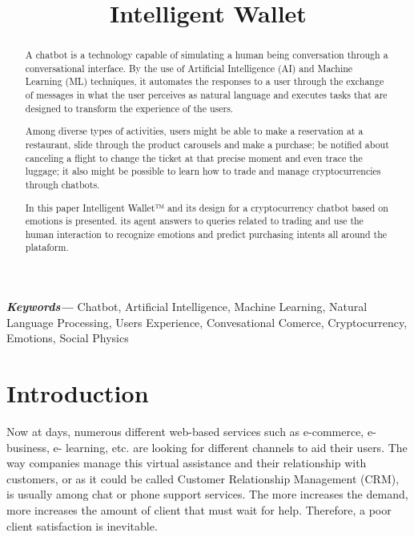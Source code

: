 \documentclass[	DIV=calc,%
							paper=letter,%
							fontsize=12pt%
                            ]{scrartcl}	 					%
\title{Intelligent Wallet}					%
\author{}											%
\date{}																				%
\newcommand{\initial}[1]{%
     \lettrine[lines=3,lhang=0.3,nindent=0em]{
     				\color{DarkGoldenrod}
     				{\textsf{#1}}}{}}
\providecommand{\keywords}[1]
{
  \small	
  \textbf{\textit{Keywords---}} #1
}
\begin{document}
\maketitle


\newpage
\begin{abstract}
	
{A chatbot is a technology capable of simulating a human being conversation through a conversational interface. By the use of Artificial Intelligence (AI) and Machine Learning (ML) techniques, it automates the responses to a user through the exchange of messages in what the user perceives as natural language and executes tasks that are designed to transform the experience of the users.

Among diverse types of activities, users might be able to make a reservation   at a restaurant, slide through the product carousels and make a purchase; be notified about canceling a flight to change the ticket at that precise moment and even trace the luggage; it also might be possible to learn how to trade and manage cryptocurrencies through chatbots.

In this paper Intelligent Wallet™ and its design for a cryptocurrency chatbot based on emotions is presented. its agent  answers to queries related to trading and use the human interaction to recognize emotions and predict purchasing intents all around the plataform.}

\end{abstract}

\keywords{Chatbot, Artificial Intelligence, Machine Learning, Natural Language Processing, Users Experience, Convesational Comerce, Cryptocurrency, Emotions, Social Physics}

\newpage
\tableofcontents
\newpage
\listoffigures
\newpage

\thispagestyle{fancy} 			%

\section{\label{sec:level1}Introduction}
Now at days, numerous different web-based services such as e-commerce, e-business, e- learning, etc. are looking for different channels to aid their users. The way companies manage this virtual assistance and their relationship with customers, or as it could be called Customer Relationship Management (CRM), is usually among chat or phone support services. The more increases the demand, more increases the amount of client that must wait for help.  Therefore, a poor client satisfaction is inevitable\cite{ranoliya2017chatbot_08126057}.
\end{document}
